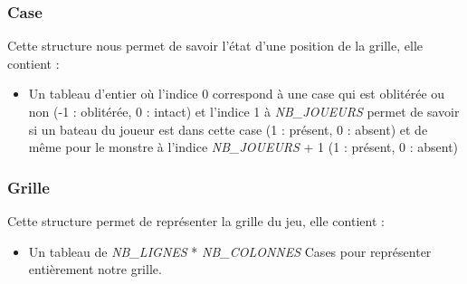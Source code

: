 \subsubsection{Case}

Cette structure nous permet de savoir l'état d'une position de la grille, elle contient :
\begin{itemize}
\item Un tableau d'entier où l'indice 0 correspond à une case qui
  est oblitérée ou non (-1 : oblitérée, 0 : intact) et l'indice 1 à
  {\textit{NB\_JOUEURS}} permet de savoir si un bateau du joueur est dans
  cette case (1 : présent, 0 : absent) et de même pour le monstre
  à l'indice {\textit{NB\_JOUEURS}} + 1 (1 : présent, 0 : absent)
\end{itemize}

\subsubsection{Grille}

Cette structure permet de représenter la grille du jeu, elle contient
:
\begin{itemize}
\item Un tableau de {\textit{NB\_LIGNES}} * {\textit{NB\_COLONNES}}
  Cases pour représenter entièrement notre grille.
\end{itemize}

